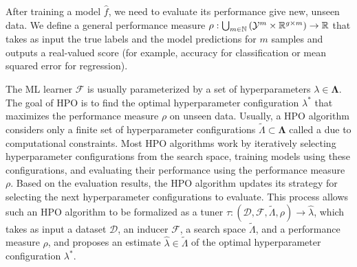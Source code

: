 After training a model \( \hat{f} \), we need to evaluate its performance give new, unseen data. We define a general performance measure \( \rho : \bigcup_{m \in \mathbb{N}} \left( \mathcal{Y}^m \times \mathbb{R}^{g \times m} \right) \to \mathbb{R} \) that takes as input the true labels and the model predictions for \( m \) samples and outputs a real-valued score (for example, accuracy for classification or mean squared error for regression).

The ML learner \( \mathscr{F} \) is usually parameterized by a set of hyperparameters \( \lambda \in \boldsymbol\Lambda \). The goal of HPO is to find the optimal hyperparameter configuration \( \lambda^* \) that maximizes the performance measure \( \rho \) on unseen data. Usually, a HPO algorithm considers only a finite set of hyperparameter configurations \( \tilde{\Lambda} \subset \boldsymbol\Lambda \) called a  due to computational constraints. Most HPO algorithms work by iteratively selecting hyperparameter configurations from the search space, training models using these configurations, and evaluating their performance using the performance measure \( \rho \). Based on the evaluation results, the HPO algorithm updates its strategy for selecting the next hyperparameter configurations to evaluate. This process allows such an HPO algorithm to be formalized as a tuner \( \tau : \left( \mathcal{D}, \mathscr{F}, \tilde{\Lambda}, \rho \right) \to \hat\lambda \), which takes as input a dataset \( \mathcal{D} \), an inducer \( \mathscr{F} \), a search space \( \tilde{\Lambda} \), and a performance measure \( \rho \), and proposes an estimate \( \hat{\lambda} \in \tilde{\Lambda} \) of the optimal hyperparameter configuration \( \lambda^* \).

